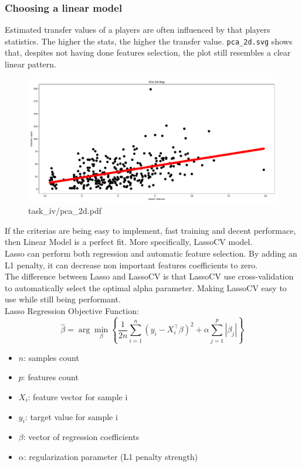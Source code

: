 \documentclass{report}
\begin{document}
\subsubsection{Choosing a linear model}
Estimated transfer values of a players are often influenced by that players statistics. The higher
the stats, the higher the transfer value. \verb|pca_2d.svg| shows that, despites not having done
features selection, the plot still resembles a clear linear pattern. \\
\begin{figure}[ht!]
    \centering
    \includegraphics[width=\textwidth]{../output/task_iv/pca_2d.pdf}
    \caption{task\_iv/pca\_2d.pdf}
\end{figure}

\newpage
\noindent
If the criterias are being easy to implement, fast training and decent performace, then 
Linear Model is a perfect fit. More specifically, LassoCV model. \\

\noindent
Lasso can perform both regression and automatic feature selection. By adding an L1 penalty, 
it can decrease non important features coefficients to zero. \\

\noindent
The difference between Lasso and LassoCV is that LassoCV use cross-validation to 
automatically select the optimal alpha parameter. Making LassoCV easy to use while still being 
performant. \\

\noindent
Lasso Regression Objective Function:
\[  %
    \hat{\beta} = \arg\min_{\beta} \left\{ \frac{1}{2n} \sum_{i=1}^{n} 
    (y_i - X_i^{\top} \beta)^2 + \alpha \sum_{j=1}^{p} |\beta_j| \right\}
\]
\begin{itemize}
    \item \( n \): samples count
    \item \( p \): features count
    \item \( X_i \): feature vector for sample i
    \item \( y_i \): target value for sample i
    \item \( \beta \): vector of regression coefficients
    \item \( \alpha \): regularization parameter (L1 penalty strength)
\end{itemize}
\end{document}
